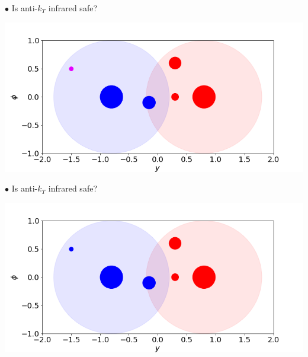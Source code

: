\documentclass[9pt,a4paper,unknownkeysallowed,xcolor=dvipsnames,aspectratio=43]{beamer}
\begin{document}
%
%
\begin{frame}

{\color{darkred}\Large$\bullet$} Is anti-$k_T$ infrared safe?\\
\vspace{2mm}
\begin{center}
\includegraphics[width=\textwidth]{03/antiktSIn.png}
\end{center}
\end{frame}
%
%
\begin{frame}

{\color{darkred}\Large$\bullet$} Is anti-$k_T$ infrared safe?\\
\vspace{2mm}
\begin{center}
\includegraphics[width=\textwidth]{03/antiktS.png}
\end{center}
\end{frame}
%
%
\end{document}
